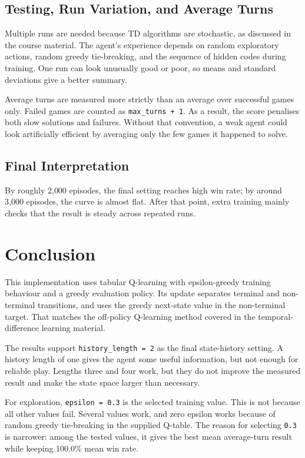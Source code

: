 \documentclass[11pt,a4paper]{article}
\begin{document}
\subsection{Testing, Run Variation, and Average Turns}

Multiple runs are needed because TD algorithms are stochastic, as discussed in the course material. The agent's experience depends on random exploratory actions, random greedy tie-breaking, and the sequence of hidden codes during training. One run can look unusually good or poor, so means and standard deviations give a better summary.

Average turns are measured more strictly than an average over successful games only. Failed games are counted as \texttt{max\_turns + 1}. As a result, the score penalises both slow solutions and failures. Without that convention, a weak agent could look artificially efficient by averaging only the few games it happened to solve.

\subsection{Final Interpretation}

By roughly 2{,}000 episodes, the final setting reaches high win rate; by around 3{,}000 episodes, the curve is almost flat. After that point, extra training mainly checks that the result is steady across repeated runs.

\section{Conclusion}

This implementation uses tabular Q-learning with epsilon-greedy training behaviour and a greedy evaluation policy. Its update separates terminal and non-terminal transitions, and uses the greedy next-state value in the non-terminal target. That matches the off-policy Q-learning method covered in the temporal-difference learning material.

The results support \texttt{history\_length = 2} as the final state-history setting. A history length of one gives the agent some useful information, but not enough for reliable play. Lengths three and four work, but they do not improve the measured result and make the state space larger than necessary.

For exploration, \texttt{epsilon = 0.3} is the selected training value. This is not because all other values fail. Several values work, and zero epsilon works because of random greedy tie-breaking in the supplied Q-table. The reason for selecting \texttt{0.3} is narrower: among the tested values, it gives the best mean average-turn result while keeping 100.0\% mean win rate.
\end{document}
